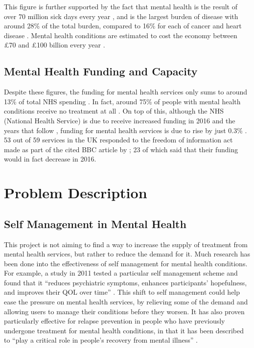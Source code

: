 \documentclass[11pt,openright,a4paper]{report}
\begin{document}
This figure is further supported by the fact that mental health is the result of over 70 million sick days every year \parencite{cmoreport2013}, and is the largest burden of disease with around 28\% of the total burden, compared to 16\% for each of cancer and heart disease \parencite{burdendisorders}. Mental health conditions are estimated to cost the economy between £70 and £100 billion every year \parencite{cmoreport2013}.

\subsection{Mental Health Funding and Capacity}
Despite these figures, the funding for mental health services only sums to around 13\% of total NHS spending \parencite{cepnhsfunding}. In fact, around 75\% of people with mental health conditions receive no treatment at all \parencite{cmoreport2013}. On top of this, although the NHS (National Health Service) is due to receive increased funding in 2016 and the years that follow \parencite{kfnhsbudget}, funding for mental health services is due to rise by just 0.3\% \parencite{mhfunding}. 53 out of 59 services in the UK responded to the freedom of information act made as part of the cited BBC article by \citeauthor{mhfunding}; 23 of which said that their funding would in fact decrease in 2016.

\section{Problem Description}
\subsection{Self Management in Mental Health}
This project is not aiming to find a way to increase the supply of treatment from mental health services, but rather to reduce the demand for it. Much research has been done into the effectiveness of self management for mental health conditions. For example, a study in 2011 tested a particular self management scheme and found that it \enquote{reduces psychiatric symptoms, enhances participants’ hopefulness, and improves their QOL over time} \parencite{wrapstudy}. This shift to self management could help ease the pressure on mental health services, by relieving some of the demand and allowing users to manage their conditions before they worsen. It has also proven particularly effective for relapse prevention in people who have previously undergone treatment for mental health conditions, in that it has been described to \enquote{play a critical role in people's recovery from mental illness} \parencite{selfmanagementrelapse}.
\end{document}
